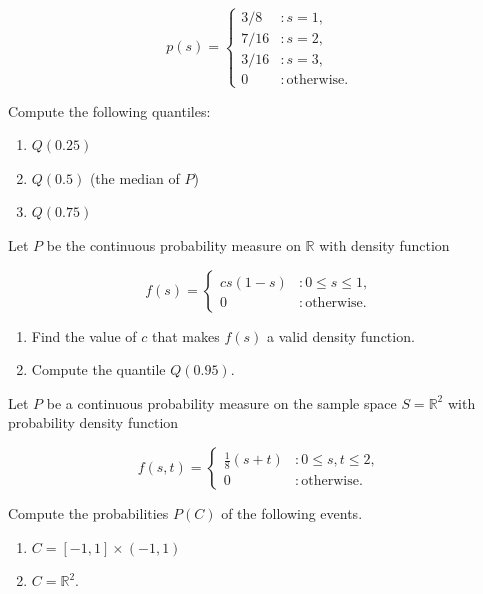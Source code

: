 \documentclass[12pt,reqno]{amsart}
\begin{document}
	\[
	p(s) = \begin{cases}
	3/8 & : s=1, \\
	7/16 & : s=2, \\
	3/16 & : s=3, \\
	0 & : \text{otherwise}.
	\end{cases}
	\]

Compute the following quantiles:

\medskip
\begin{enumerate}
\item $Q(0.25)$\vfill
\item $Q(0.5)$ (the median of $P$)\vfill
\item $Q(0.75)$\vfill
\end{enumerate}












\prob Let $P$ be the continuous probability measure on $\mathbb{R}$ with density function

	\[f(s) = \begin{cases}
	cs(1-s) & : 0 \leq s \leq 1, \\
	0 & : \text{otherwise}.
	\end{cases}
	\]

\medskip
\begin{enumerate}
\item Find the value of $c$ that makes $f(s)$ a valid density function.\vfill
\item Compute the quantile $Q(0.95)$.\vfill
\end{enumerate}












\newpage
\prob Let $P$ be a continuous probability measure on the sample space $S=\mathbb{R}^2$ with probability density function

	\[
	f(s,t) = \begin{cases}
	\frac{1}{8}(s+t) & : 0\leq s,t \leq 2, \\
	0 & : \text{otherwise}.    
	\end{cases}
	\]

Compute the probabilities $P(C)$ of the following events.

\medskip
\begin{enumerate}
\item $C=[-1,1] \times (-1,1)$\vfill
\item $C = \mathbb{R}^2$.\vfill
\end{enumerate}
\end{document}
